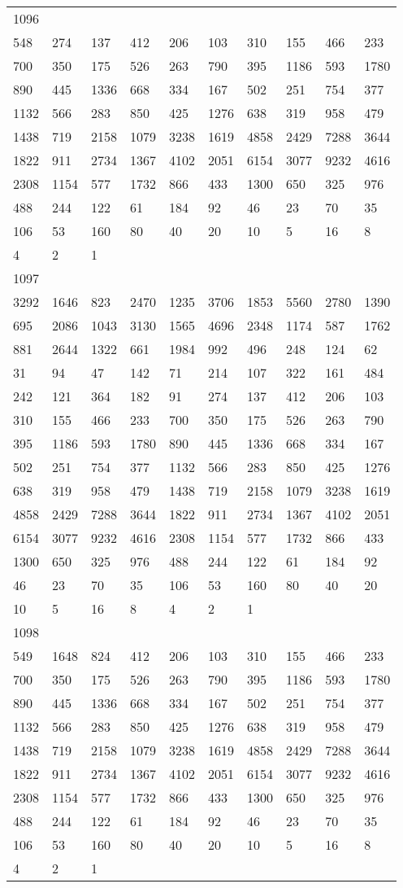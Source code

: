 \begin{longtable}{*{10}{l}}
1096&&&&&&&&&\\
548& 274& 137& 412& 206& 103& 310& 155& 466& 233\\
700& 350& 175& 526& 263& 790& 395& 1186& 593& 1780\\
890& 445& 1336& 668& 334& 167& 502& 251& 754& 377\\
1132& 566& 283& 850& 425& 1276& 638& 319& 958& 479\\
1438& 719& 2158& 1079& 3238& 1619& 4858& 2429& 7288& 3644\\
1822& 911& 2734& 1367& 4102& 2051& 6154& 3077& 9232& 4616\\
2308& 1154& 577& 1732& 866& 433& 1300& 650& 325& 976\\
488& 244& 122& 61& 184& 92& 46& 23& 70& 35\\
106& 53& 160& 80& 40& 20& 10& 5& 16& 8\\
4& 2& 1& \\

1097&&&&&&&&&\\
3292& 1646& 823& 2470& 1235& 3706& 1853& 5560& 2780& 1390\\
695& 2086& 1043& 3130& 1565& 4696& 2348& 1174& 587& 1762\\
881& 2644& 1322& 661& 1984& 992& 496& 248& 124& 62\\
31& 94& 47& 142& 71& 214& 107& 322& 161& 484\\
242& 121& 364& 182& 91& 274& 137& 412& 206& 103\\
310& 155& 466& 233& 700& 350& 175& 526& 263& 790\\
395& 1186& 593& 1780& 890& 445& 1336& 668& 334& 167\\
502& 251& 754& 377& 1132& 566& 283& 850& 425& 1276\\
638& 319& 958& 479& 1438& 719& 2158& 1079& 3238& 1619\\
4858& 2429& 7288& 3644& 1822& 911& 2734& 1367& 4102& 2051\\
6154& 3077& 9232& 4616& 2308& 1154& 577& 1732& 866& 433\\
1300& 650& 325& 976& 488& 244& 122& 61& 184& 92\\
46& 23& 70& 35& 106& 53& 160& 80& 40& 20\\
10& 5& 16& 8& 4& 2& 1& \\

1098&&&&&&&&&\\
549& 1648& 824& 412& 206& 103& 310& 155& 466& 233\\
700& 350& 175& 526& 263& 790& 395& 1186& 593& 1780\\
890& 445& 1336& 668& 334& 167& 502& 251& 754& 377\\
1132& 566& 283& 850& 425& 1276& 638& 319& 958& 479\\
1438& 719& 2158& 1079& 3238& 1619& 4858& 2429& 7288& 3644\\
1822& 911& 2734& 1367& 4102& 2051& 6154& 3077& 9232& 4616\\
2308& 1154& 577& 1732& 866& 433& 1300& 650& 325& 976\\
488& 244& 122& 61& 184& 92& 46& 23& 70& 35\\
106& 53& 160& 80& 40& 20& 10& 5& 16& 8\\
4& 2& 1& \\


\end{longtable}
